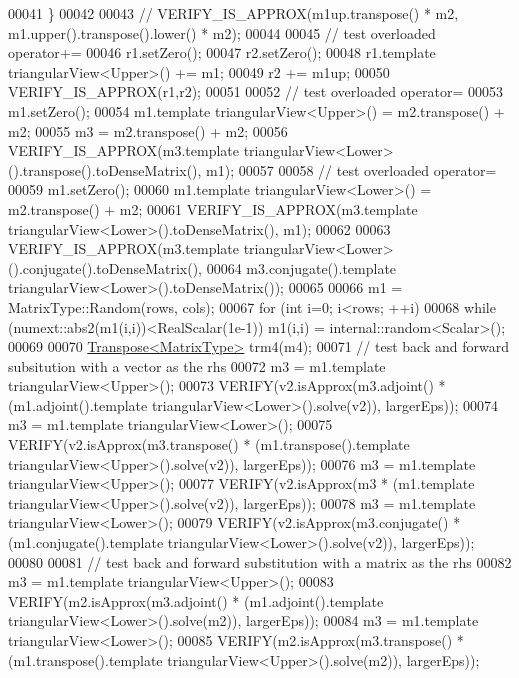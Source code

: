 \begin{DoxyCode}
00041   \}
00042 
00043 \textcolor{comment}{//   VERIFY\_IS\_APPROX(m1up.transpose() * m2, m1.upper().transpose().lower() * m2);}
00044 
00045   \textcolor{comment}{// test overloaded operator+=}
00046   r1.setZero();
00047   r2.setZero();
00048   r1.template triangularView<Upper>() +=  m1;
00049   r2 += m1up;
00050   VERIFY\_IS\_APPROX(r1,r2);
00051 
00052   \textcolor{comment}{// test overloaded operator=}
00053   m1.setZero();
00054   m1.template triangularView<Upper>() = m2.transpose() + m2;
00055   m3 = m2.transpose() + m2;
00056   VERIFY\_IS\_APPROX(m3.template triangularView<Lower>().transpose().toDenseMatrix(), m1);
00057 
00058   \textcolor{comment}{// test overloaded operator=}
00059   m1.setZero();
00060   m1.template triangularView<Lower>() = m2.transpose() + m2;
00061   VERIFY\_IS\_APPROX(m3.template triangularView<Lower>().toDenseMatrix(), m1);
00062 
00063   VERIFY\_IS\_APPROX(m3.template triangularView<Lower>().conjugate().toDenseMatrix(),
00064                    m3.conjugate().template triangularView<Lower>().toDenseMatrix());
00065 
00066   m1 = MatrixType::Random(rows, cols);
00067   \textcolor{keywordflow}{for} (\textcolor{keywordtype}{int} i=0; i<rows; ++i)
00068     \textcolor{keywordflow}{while} (numext::abs2(m1(i,i))<RealScalar(1e-1)) m1(i,i) = internal::random<Scalar>();
00069 
00070   \hyperlink{group___core___module_class_eigen_1_1_transpose}{Transpose<MatrixType>} trm4(m4);
00071   \textcolor{comment}{// test back and forward subsitution with a vector as the rhs}
00072   m3 = m1.template triangularView<Upper>();
00073   VERIFY(v2.isApprox(m3.adjoint() * (m1.adjoint().template triangularView<Lower>().solve(v2)), largerEps));
00074   m3 = m1.template triangularView<Lower>();
00075   VERIFY(v2.isApprox(m3.transpose() * (m1.transpose().template triangularView<Upper>().solve(v2)), 
      largerEps));
00076   m3 = m1.template triangularView<Upper>();
00077   VERIFY(v2.isApprox(m3 * (m1.template triangularView<Upper>().solve(v2)), largerEps));
00078   m3 = m1.template triangularView<Lower>();
00079   VERIFY(v2.isApprox(m3.conjugate() * (m1.conjugate().template triangularView<Lower>().solve(v2)), 
      largerEps));
00080 
00081   \textcolor{comment}{// test back and forward substitution with a matrix as the rhs}
00082   m3 = m1.template triangularView<Upper>();
00083   VERIFY(m2.isApprox(m3.adjoint() * (m1.adjoint().template triangularView<Lower>().solve(m2)), largerEps));
00084   m3 = m1.template triangularView<Lower>();
00085   VERIFY(m2.isApprox(m3.transpose() * (m1.transpose().template triangularView<Upper>().solve(m2)), 
      largerEps));

\end{DoxyCode}
